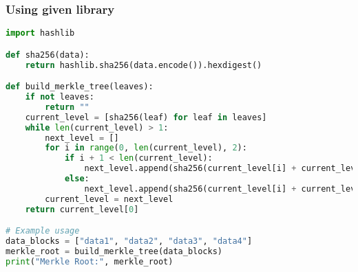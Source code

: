 \subsubsection{Using given library}
\begin{lstlisting}[language = Python]
    import hashlib

def sha256(data):
    return hashlib.sha256(data.encode()).hexdigest()

def build_merkle_tree(leaves):
    if not leaves:
        return ""
    current_level = [sha256(leaf) for leaf in leaves]
    while len(current_level) > 1:
        next_level = []
        for i in range(0, len(current_level), 2):
            if i + 1 < len(current_level):
                next_level.append(sha256(current_level[i] + current_level[i + 1]))
            else:
                next_level.append(sha256(current_level[i] + current_level[i]))  # Duplicate last node if odd
        current_level = next_level
    return current_level[0]

# Example usage
data_blocks = ["data1", "data2", "data3", "data4"]
merkle_root = build_merkle_tree(data_blocks)
print("Merkle Root:", merkle_root)

\end{lstlisting}
